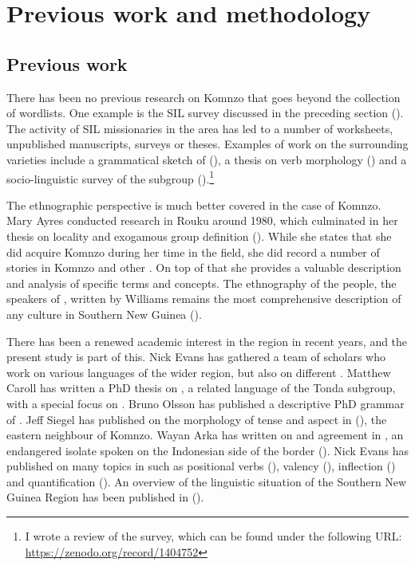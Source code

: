 \section{Previous work and methodology}\label{prevmethod}

\subsection{Previous work}\label{previouswork}

There has been no previous research on Komnzo that goes beyond the collection of wordlists. One example is the SIL survey discussed in the preceding section (\citealt{Clifton:1991fly}). The activity of SIL missionaries in the area has led to a number of  worksheets, unpublished manuscripts, surveys or theses. Examples of work on the surrounding varieties include a grammatical sketch of  (\citealt{Bouve:2003ar}), a thesis on  verb morphology (\citealt{Sarsa2001:wa}) and a socio-linguistic survey of the  subgroup (\citealt{Grummit:2012sur}).\footnote{I wrote a review of the survey, which can be found under the following URL: \url{https://zenodo.org/record/1404752}}

The ethnographic perspective is much better covered in the case of Komnzo. Mary Ayres conducted research in Rouku around 1980, which culminated in her thesis on locality and exogamous group definition (\citealt{Ayres:ws}). While she states that she did acquire Komnzo during her time in the field, she did record a number of stories in Komnzo and other . On top of that she provides a valuable description and analysis of specific terms and concepts. The ethnography of the  people, the speakers of , written by Williams remains the most comprehensive description of any culture in Southern New Guinea (\citealt{Williams:1936transfly}).

There has been a renewed academic interest in the region in recent years, and the present study is part of this. Nick Evans has gathered a team of scholars who work on various languages of the wider region, but also on different . Matthew Caroll has written a PhD thesis on , a related language of the Tonda subgroup, with a special focus on  \citep{Carroll:Ngkolmpu}. Bruno Olsson has published a descriptive PhD grammar of  \citep{Olsson:Marind}. Jeff Siegel has published on the morphology of tense and aspect in  (\citealt{Siegel:2015bp}), the eastern neighbour of Komnzo. Wayan Arka has written on  and agreement in , an endangered isolate spoken on the Indonesian side of the border (\citealt{Arka:2012tt}). Nick Evans has published on many topics in  such as positional verbs (\citealt{Evans:2014bz}), valency (\citealt{Evans:2015wy}), inflection (\citealt{Evans:2015to}) and quantification (\citealt{Evans:quant}). An overview of the linguistic situation of the Southern New Guinea Region has been published in (\citealt{Evans:sng}).

